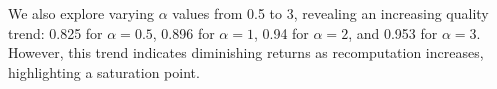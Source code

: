 We also explore varying $\alpha$ values from 0.5 to 3, revealing an increasing quality trend: 0.825 for $\alpha=0.5$, 0.896 for $\alpha=1$, 0.94 for $\alpha=2$, and 0.953 for $\alpha=3$. However, this trend indicates diminishing returns as recomputation increases, highlighting a saturation point.








    


    
